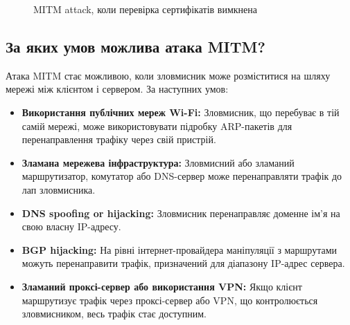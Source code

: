 \begin{figure}[!htbp]
    \centering
    \caption{MITM attack, коли перевірка сертифікатів вимкнена}
    \label{fig:mitm_attack}
\end{figure}

\subsection*{За яких умов можлива атака MITM?}

Атака MITM стає можливою, коли зловмисник може розміститися на шляху мережі між клієнтом і сервером. За наступних 
умов:
\begin{itemize}
    \item \textbf{Використання публічних мереж Wi-Fi:} Зловмисник, що перебуває в тій самій мережі, може 
        використовувати підробку ARP-пакетів для перенаправлення трафіку через свій пристрій.
    \item \textbf{Зламана мережева інфраструктура:} Зловмисний або зламаний маршрутизатор, комутатор або 
        DNS-сервер може перенаправляти трафік до лап зловмисника.
    \item \textbf{DNS spoofing or hijacking:} Зловмисник перенаправляє доменне ім’я на свою власну IP-адресу.
    \item \textbf{BGP hijacking:} На рівні інтернет-провайдера маніпуляції з маршрутами можуть перенаправити 
        трафік, призначений для діапазону IP-адрес сервера.
    \item \textbf{Зламаний проксі-сервер або використання VPN:} Якщо клієнт маршрутизує трафік через проксі-сервер 
        або VPN, що контролюється зловмисником, весь трафік стає доступним.
\end{itemize}

